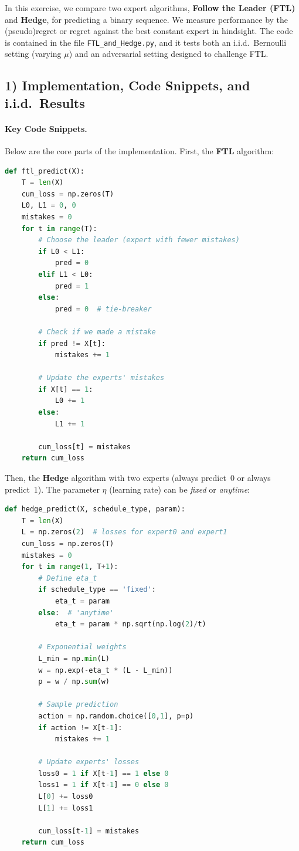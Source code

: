 In this exercise, we compare two expert algorithms, \textbf{Follow the Leader (FTL)} and \textbf{Hedge}, for predicting a binary sequence. We measure performance by the (pseudo)regret or regret against the best constant expert in hindsight. The code is contained in the file \texttt{FTL\_and\_Hedge.py}, and it tests both an i.i.d.\ Bernoulli setting (varying \(\mu\)) and an adversarial setting designed to challenge FTL.

\subsection*{1) Implementation, Code Snippets, and i.i.d.\ Results}

\paragraph{Key Code Snippets.}
Below are the core parts of the implementation.  First, the \textbf{FTL} algorithm:

\begin{lstlisting}[language=Python, caption={FTL implementation.}]
def ftl_predict(X):
    T = len(X)
    cum_loss = np.zeros(T)
    L0, L1 = 0, 0
    mistakes = 0
    for t in range(T):
        # Choose the leader (expert with fewer mistakes)
        if L0 < L1:
            pred = 0
        elif L1 < L0:
            pred = 1
        else:
            pred = 0  # tie-breaker

        # Check if we made a mistake
        if pred != X[t]:
            mistakes += 1

        # Update the experts' mistakes
        if X[t] == 1:
            L0 += 1
        else:
            L1 += 1

        cum_loss[t] = mistakes
    return cum_loss
\end{lstlisting}

Then, the \textbf{Hedge} algorithm with two experts (always predict~0 or always predict~1).  The parameter \(\eta\) (learning rate) can be \emph{fixed} or \emph{anytime}:

\begin{lstlisting}[language=Python, caption={Hedge implementation.}]
def hedge_predict(X, schedule_type, param):
    T = len(X)
    L = np.zeros(2)  # losses for expert0 and expert1
    cum_loss = np.zeros(T)
    mistakes = 0
    for t in range(1, T+1):
        # Define eta_t
        if schedule_type == 'fixed':
            eta_t = param
        else:  # 'anytime'
            eta_t = param * np.sqrt(np.log(2)/t)

        # Exponential weights
        L_min = np.min(L)
        w = np.exp(-eta_t * (L - L_min))
        p = w / np.sum(w)

        # Sample prediction
        action = np.random.choice([0,1], p=p)
        if action != X[t-1]:
            mistakes += 1

        # Update experts' losses
        loss0 = 1 if X[t-1] == 1 else 0
        loss1 = 1 if X[t-1] == 0 else 0
        L[0] += loss0
        L[1] += loss1

        cum_loss[t-1] = mistakes
    return cum_loss
\end{lstlisting}


